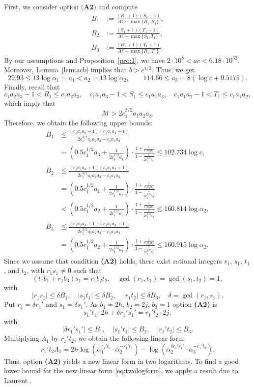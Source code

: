 \documentclass{amsart}
\theoremstyle{definition}
\begin{document}
First, we consider option $\textbf{(A2)}$ and compute
\begin{align*}
B_1 &:= \frac{(R_1+1)(S_1+1)}{\mathcal{M}-\max\{R_1,S_1\}},\\
B_2 &:= \frac{(S_1+1)(T_1+1)}{\mathcal{M}-\max\{S_1,T_1\}},\\
B_3 &:= \frac{(R_1+1)(T_1+1)}{\mathcal{M}-\max\{R_1,T_1\}}. 
\end{align*}
By our assumptions and Proposition~\ref{pro:1}, we have $2\cdot 10^{8}<ac<6.18\cdot 10^{32}$. Moreover, 
Lemma~\ref{lem:acb} implies that $b>c^{1/3}$. Thus, we get
$$
29.93 \le 13\log \alpha_1=a_1<a_2 =13\log\alpha_2,\qquad 114.66\le a_3 = 8(\log c+ 0.5175). 
$$
Finally, recall that
$$
c_1a_2a_3-1<R_1\le c_1a_2a_3,\quad c_1a_1a_3-1<S_1\le c_1a_1a_3,\quad c_1a_1a_2-1<T_1\le c_1a_1a_2,
$$
which imply that
$$
\mathcal{M}>2c_1^{3/2}a_1a_2a_3.
$$
Therefore, we obtain the following upper bounds:
\begin{align*}
B_1 &\le \frac{(c_1a_2a_3+1)(c_1a_1a_3+1)}{2c_1^{3/2}a_1a_2a_3-c_1a_2a_3}\\
& = \left(0.5c_1^{1/2}a_3+\frac{1}{2c_1^{1/2}a_1}\right)\cdot \frac{1+\frac{1}{c_1a_2a_3}}{1-\frac{1}{2c_1^{1/2}a_1}}\le 102.734\log c,\\
B_2 &\le \frac{(c_1a_1a_3+1)(c_1a_1a_2+1)}{2c_1^{3/2}a_1a_2a_3-c_1a_1a_3}\\
&= \left(0.5c_1^{1/2}a_1+\frac{1}{2c_1^{1/2}a_2}\right)\cdot \frac{1+\frac{1}{c_1a_1a_3}}{1-\frac{1}{2c_1^{1/2}a_2}}\\
& < \left(0.5c_1^{1/2}a_2+\frac{1}{2c_1^{1/2}a_2}\right)\cdot \frac{1+\frac{1}{c_1a_1a_3}}{1-\frac{1}{2c_1^{1/2}a_2}}\le 160.814\log\alpha_2,\\
B_3 &\le \frac{(c_1a_2a_3+1)(c_1a_1a_2+1)}{2c_1^{3/2}a_1a_2a_3-c_1a_2a_3}\\
& = \left(0.5c_1^{1/2}a_2+\frac{1}{2c_1^{1/2}a_1}\right)\cdot \frac{1+\frac{1}{c_1a_2a_3}}{1-\frac{1}{2c_1^{1/2}a_1}}\le 160.915\log\alpha_2.
\end{align*}
Since we assume that condition \textbf{(A2)} holds, there exist rational integers $r_1$, $s_1$, $t_1$, and $t_2$, with $r_1s_1\neq 0$ such that 
$$
(t_1b_1+r_1b_3)s_1 = r_1b_2t_2,\quad \gcd(r_1,t_1) = \gcd(s_1,t_2)=1,
$$
with
$$
|r_1s_1| \le \delta B_1, \quad |s_1t_1| \le \delta  B_2, \quad  |r_1t_2| \le \delta  B_3, \quad \delta = \gcd(r_1,s_1).$$
Put $r_1=\delta r_1'$ and $s_1 = \delta s_1'$. As $b_1= 2h$, $b_2 = 2j$, $b_3=1$ option \textbf{(A2)} is
$$
s_1't_1\cdot 2h + \delta r_1's_1'  = r_1' t_2 \cdot 2j,
$$
with
$$
|\delta r_1's_1'| \le  B_1, \quad |s_1't_1| \le  B_2, \quad  |r_1't_2| \le  B_3. 
$$
Multiplying $\Lambda_1$ by $r_1' t_2$, we obtain the following linear form 
\begin{equation}\label{eq:twologform}
r_1't_2 \Lambda_1 = 2h\log(\alpha_1^{r_1't_2}\cdot \alpha_2^{-s_1't_1}) - \log\left(\alpha_2^{\delta r_1's_1'} \cdot\alpha_3^{-r_1't_2}\right). 
\end{equation}
Thus, option \textbf{(A2)} yields a new linear form in two logarithms. To find a good lower bound for the new linear form \eqref{eq:twologform},
we apply a result due to Laurent \cite{Laurent:2008}. 
\end{document}

